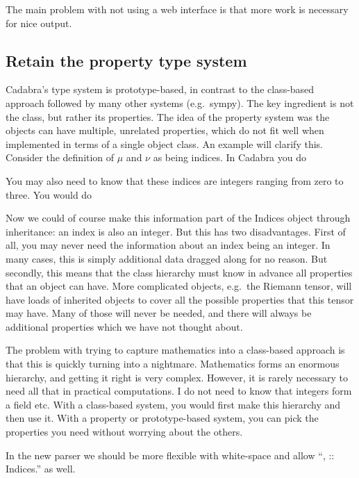 \documentclass[11pt]{article}
\begin{document}
The main problem with not using a web interface is that more work is
necessary for nice output. 

\subsection{Retain the property type system}

Cadabra's type system is prototype-based, in contrast to the
class-based approach followed by many other systems (e.g.~sympy). 
The key ingredient is not the class, but rather its properties.
The idea of the property system was the objects can have multiple,
unrelated properties, which do not fit well when implemented in terms
of a single object class. An example will clarify this. Consider the
definition of $\mu$ and $\nu$ as being indices. In Cadabra you do
\begin{quote}
\end{quote}
You may also need to know that these indices are integers ranging from
zero to three. You would do
\begin{quote}
\end{quote}
Now we could of course make this information part of the Indices
object through inheritance: an index is also an integer. But this has
two disadvantages. First of all, you may never need the information
about an index being an integer. In many cases, this is simply
additional data dragged along for no reason. But secondly, this means
that the class hierarchy must know in advance all properties that an
object can have. More complicated objects, e.g.~the Riemann tensor,
will have loads of inherited objects to cover all the possible
properties that this tensor may have. Many of those will never be
needed, and there will always be additional properties which we have
not thought about. 

The problem with trying to capture mathematics into a class-based
approach is that this is quickly turning into a nightmare. Mathematics
forms an enormous hierarchy, and getting it right is very
complex. However, it is rarely necessary to need all that in practical
computations. I do not need to know that integers form a field
etc. With a class-based system, you would first make this hierarchy
and then use it. With a property or prototype-based system, you can
pick the properties you need without worrying about the others.

In the new parser we should be more flexible with white-space and
allow ``{\mu,\nu} :: Indices.'' as well.
\end{document}
